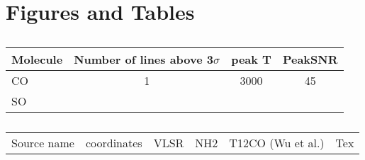 \section{Figures and Tables}
\begin{table}
\caption{}
\begin{tabular}{ l c c c }
Molecule & Number of lines above 3$\sigma$ & peak T & PeakSNR\\
\hline
CO       & 1               & 3000   & 45      \\
SO       
\hline
\end{tabular}
\end{table}


\begin{table}
\caption{}
\begin{tabular}{ l c c c c c}
Source name & coordinates & VLSR & NH2 & T12CO (Wu et al.)& Tex \\
\end{tabular}
\end{table}
 
  
  
  
  
  
  
  
  
  
  
  
  
  
  
  
  
  
  
  
  
  
  
  
  